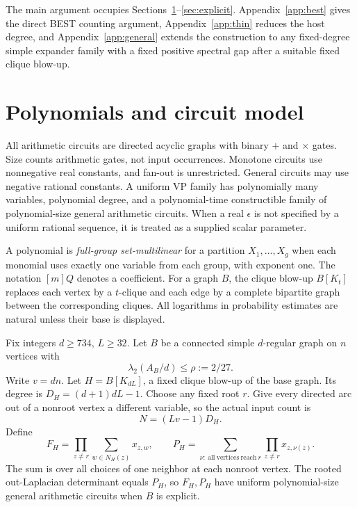 \documentclass[11pt]{article}
\theoremstyle{definition}
\theoremstyle{remark}
\numberwithin{equation}{section}
\begin{document}
The main argument occupies Sections~\ref{sec:model}--\ref{sec:explicit}.
Appendix~\ref{app:best} gives the direct BEST counting argument,
Appendix~\ref{app:thin} reduces the host degree, and
Appendix~\ref{app:general} extends the construction to any fixed-degree
simple expander family with a fixed positive spectral gap after a
suitable fixed clique blow-up.



\section{Polynomials and circuit model}\label{sec:model}

All arithmetic circuits are directed acyclic graphs with binary \(+\)
and \(\times\) gates. Size counts arithmetic gates, not input occurrences.
Monotone circuits use nonnegative real constants, and fan-out is unrestricted.
General circuits may use negative rational constants. A uniform VP family
has polynomially many variables, polynomial degree, and a polynomial-time
constructible family of polynomial-size general arithmetic circuits.
When a real \(\epsilon\) is not specified by a uniform rational sequence,
it is treated as a supplied scalar parameter.

A polynomial is \emph{full-group set-multilinear} for a partition
\(X_1,\ldots,X_g\) when each monomial uses exactly one variable from each
group, with exponent one. The notation \([m]Q\) denotes a coefficient.
For a graph \(B\), the clique blow-up \(B[K_t]\) replaces each vertex
by a \(t\)-clique and each edge by a complete bipartite graph between
the corresponding cliques. All logarithms in probability estimates
are natural unless their base is displayed.

Fix integers \(d\ge734\), \(L\ge32\). Let \(B\) be a connected
simple \(d\)-regular graph on \(n\) vertices with
\begin{equation}\label{eq:1}
\lambda_2(A_B/d)\le\rho:=2/27.
\end{equation}
Write \(v=dn\). Let \(H=B[K_{dL}]\), a fixed clique blow-up
of the base graph. Its degree is \(D_H=(d+1)dL-1\).
Choose any fixed root \(r\). Give every directed arc out of a
nonroot vertex a different variable, so the actual input count is
\begin{equation}\label{eq:2}
N=(Lv-1)D_H .
\end{equation}
Define
\[
 F_H=\prod_{z\ne r}\sum_{w\in N_H(z)}x_{z,w},\qquad
 P_H=\sum_{\nu:\ \mathrm{all\ vertices\ reach}\ r}
                              \prod_{z\ne r}x_{z,\nu(z)}.
\]
The sum is over all choices of one neighbor at each nonroot vertex.
The rooted out-Laplacian determinant equals \(P_H\), so \(F_H,P_H\)
have uniform polynomial-size general arithmetic circuits when \(B\)
is explicit.
\end{document}
